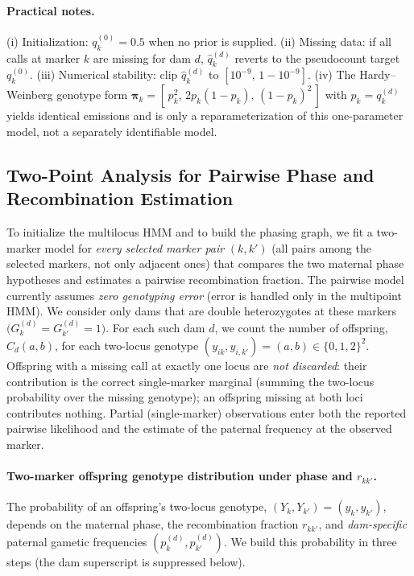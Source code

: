 \documentclass[11pt]{article}
\begin{document}
\paragraph{Practical notes.}
(i) Initialization: \(q^{(0)}_k=0.5\) when no prior is supplied.
(ii) Missing data: if all calls at marker \(k\) are missing for dam \(d\), \(\hat q_k^{(d)}\) reverts
to the pseudocount target \(q^{(0)}_k\).
(iii) Numerical stability: clip \(\hat q_k^{(d)}\) to \([10^{-9},\,1-10^{-9}]\).
(iv) The Hardy--Weinberg genotype form \(\boldsymbol{\pi}_k=[\,p_k^2,\,2p_k(1-p_k),\,(1-p_k)^2\,]\)
with \(p_k=q_k^{(d)}\) yields identical emissions and is only a reparameterization of this
one-parameter model, not a separately identifiable model.

\subsection{Two-Point Analysis for Pairwise Phase and Recombination Estimation}
\label{sec:tpt}
To initialize the multilocus HMM and to build the phasing graph, we fit a two-marker model for \emph{every selected marker pair} $(k,k')$ (all pairs among the selected markers, not only adjacent ones) that compares the two maternal phase hypotheses and estimates a pairwise recombination fraction. The pairwise model currently assumes \emph{zero genotyping error} (error is handled only in the multipoint HMM). We consider only dams that are double heterozygotes at these markers \(\bigl(G_k^{(d)}=G_{k'}^{(d)}=1\bigr)\). For each such dam $d$, we count the number of offspring, $C_d(a,b)$, for each two-locus genotype $(y_{ik},y_{i,k'})=(a,b)\in\{0,1,2\}^2$. Offspring with a missing call at exactly one locus are \emph{not discarded}: their contribution is the correct single-marker marginal (summing the two-locus probability over the missing genotype); an offspring missing at both loci contributes nothing. Partial (single-marker) observations enter both the reported pairwise likelihood and the estimate of the paternal frequency at the observed marker.

\paragraph{Two-marker offspring genotype distribution under phase and $r_{kk'}$.}
The probability of an offspring's two-locus genotype, $(Y_k,Y_{k'})=(y_k,y_{k'})$, depends on the maternal phase, the recombination fraction $r_{kk'}$, and \emph{dam-specific} paternal gametic frequencies $(p_k^{(d)},p_{k'}^{(d)})$. We build this probability in three steps (the dam superscript is suppressed below).
\end{document}

